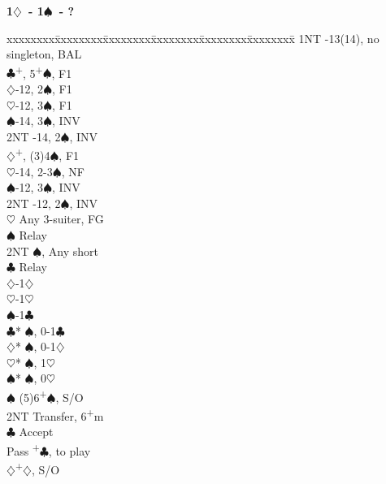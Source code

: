 \documentclass[10pt]{article}
\renewcommand{\c}{$\clubsuit$}
\renewcommand{\d}{$\diamondsuit$}
\newcommand{\h}{$\heartsuit$}
\newcommand{\s}{$\spadesuit$}
\newcommand{\p}{\textsuperscript{+}}
\newenvironment{bidtable}[1][]
{\textbf{#1}
  \begin{adjustwidth}{1em}{}
    \addvspace{2pt}
    \begin{tabbing}
      xxxxxxxx\=xxxxxxxx\=xxxxxxxx\=xxxxxxxx\=xxxxxxxx\=xxxxxxxx\=\kill}
{\end{tabbing}\end{adjustwidth}\bigskip}%
\begin{document}
\begin{multicols*}{2}
\begin{bidtable}[1\d\ - 1\s\ - ?]
1NT  -13(14), no singleton, BAL                   \\
     \c  {}\p, 5\p\s, F1                         \\
     \>      \d {}-12, 2\s, F1                  \\
     \>      \h {}-12, 3\s, F1                  \\
     \>      \s {}-14, 3\s, INV                 \\
     \>      \> 2NT -14, 2\s, INV                 \\
     \d  {}\p, (3)4\s, F1                         \\
     \>      \h {}-14, 2-3\s, NF                \\
     \>      \s {}-12, 3\s, INV                 \\
     \>      \> 2NT -12, 2\s, INV                 \\
     \h  \> Any 3-suiter, FG                       \\
     \>      \s \> Relay                           \\
     \>      \>     \> 2NT  \s, Any short          \\
     \>      \>     \>      \c \> Relay            \\
     \>      \>     \>      \>     \d{}-1\d     \\
     \>      \>     \>      \>     \h{}-1\h     \\
     \>      \>     \>      \>     \s{}-1\c     \\
     \>      \>     \c* {}\s, 0-1\c              \\
     \>      \>     \d* {}\s, 0-1\d              \\
     \>      \>     \h* {}\s, 1\h                \\
     \>      \>     \s* {}\s, 0\h                \\
     \s  \> (5)6\p\s, S/O                          \\
     \> 2NT  \> Transfer, 6\p m                        \\
     \>      \c \> Accept                          \\
     \>      \>     \> Pass \p\c, to play          \\
     \>      \>     \d  {}\p\d, S/O              \\

\end{bidtable}
\end{multicols*}
\end{document}
